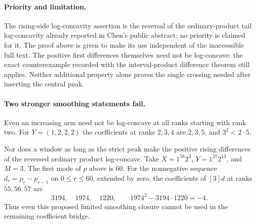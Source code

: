 \paragraph{Priority and limitation.}
The rising-side log-concavity assertion is the reversal of the
ordinary-product tail log-concavity already reported in Chen's
public abstract; no priority is claimed for it. The proof above
is given to make its use independent of the inaccessible full
text. The positive first differences themselves need not be
log-concave: the exact counterexample recorded with the
interval-product difference theorem still applies. Neither
additional property alone proves the single crossing needed
after inserting the central peak.

\paragraph{Two stronger smoothing statements fail.}
Even an increasing arm need not be log-concave at all ranks
starting with rank two. For $Y=(1,2,2,2)$ the coefficients at
ranks $2,3,4$ are $2,3,5$, and $3^2<2\cdot5$.

Nor does a window as long as the strict peak make the positive
rising differences of the reversed ordinary product log-concave.
Take $X=1^{58}2^3$, $Y=1^{37}2^{13}$, and $M=3$.
The first mode of $p$ above is $60$. For the nonnegative sequence
$d_r=p_r-p_{r-1}$ on $0\le r\le60$, extended by zero,
the coefficients of $[3]d$ at ranks $55,56,57$ are
\[
 3194,\quad1974,\quad1220,
 \qquad1974^2-3194\cdot1220=-4.
\]
Thus even this proposed limited smoothing closure cannot be
used in the remaining coefficient bridge.
